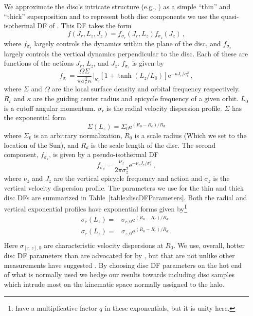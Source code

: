 We approximate the disc's intricate structure (e.g., \textcite{bovy12}) as a simple ``thin'' and ``thick'' superposition and to represent both disc components we use the quasi-isothermal DF of \textcite{binney11} \parencite[see also ][]{binney10}. This DF takes the form
\begin{equation}
    f(J_{r},L_{z},J_{z}) = f_{\sigma_{r}}(J_{r},L_{z})f_{\sigma_{z}}(J_{z})\,,
\end{equation}
where $f_{\sigma_{r}}$ largely controls the dynamics within the plane of the disc, and $f_{\sigma_{z}}$ largely controls the vertical dynamics perpendicular to the disc. Each of these are functions of the actions $J_{r}$, $L_{z}$, and $J_{z}$. $f_{\sigma_{r}}$ is given by
\begin{equation}
    f_{\sigma_{r}} = \frac{\Omega \Sigma}{ \pi \sigma_{r}^{2} \kappa } \bigg \rvert_{R_{c}} [1 + \tanh(L_{z}/L_{0})] \mathrm{e}^{-\kappa J_{r} / \sigma_{r}^{2}}\,,
\end{equation}
where $\Sigma$ and $\Omega$ are the local surface density and orbital frequency respectively. $R_{c}$ and $\kappa$ are the guiding center radius and epicycle frequency of a given orbit. $L_{0}$ is a cutoff angular momentum. $\sigma_{r}$ is the radial velocity dispersion profile. $\Sigma$ has the exponential form
\begin{equation}
    \Sigma(L_{z}) = \Sigma_{0} \mathrm{e}^{(R_{0}-R_{c})/R_{d}}
\end{equation}
where $\Sigma_{0}$ is an arbitrary normalization, $R_{0}$ is a scale radius (Which we set to the location of the Sun), and $R_{d}$ is the scale length of the disc.
The second component, $f_{\sigma_{z}}$, is given by a pseudo-isothermal DF
\begin{equation}
    f_{\sigma_{z}} =  \frac{\nu_{z}}{2\pi \sigma_{z}^{2}} \mathrm{e}^{-\nu_{z} J_{z}/\sigma_{z}^{2}}\,,
\end{equation}
where $\nu_{z}$ and $J_{z}$ are the vertical epicycle frequency and action and $\sigma_{z}$ is the vertical velocity dispersion profile. The parameters we use for the thin and thick disc DFs are summarized in Table~\ref{table:discDFParameters}. Both the radial and vertical exponential profiles have exponential forms given by\footnote{\textcite{binney11} have a multiplicative factor $q$ in these exponentials, but it is unity here.}
\begin{equation}
    \begin{split}
        \nonumber \sigma_{r}(L_{z}) = & \sigma_{r,0} \mathrm{e}^{(R_{0}-R_{c})/R_{d}} \\
        \sigma_{r}(L_{z}) = & \sigma_{z,0} \mathrm{e}^{(R_{0}-R_{c})/R_{d}}\,. \\
    \end{split}
\end{equation}
Here $\sigma_{[r,z],0}$ are characteristic velocity dispersions at $R_{0}$. We use, overall, hotter disc DF parameters than are advocated for by \textcite{binney11}, but that are not unlike other measurements have suggested \parencite[e.g. ][]{bovy12,mackereth19b}. By choosing disc DF parameters on the hot end of what is normally used we hedge our results towards including disc samples which intrude most on the kinematic space normally assigned to the halo.

